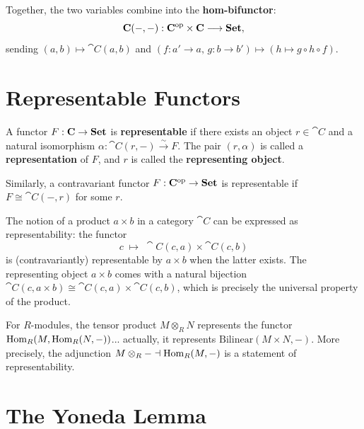 \begin{definition}
Together, the two variables combine into the \textbf{hom-bifunctor}:
\[
  \mathbf{C}(-,-): \mathbf{C}^{\mathrm{op}} \times \mathbf{C} \longrightarrow \mathbf{Set},
\]
sending $(a, b) \mapsto \cat{C}(a,b)$ and $(f: a' \to a,\, g: b \to b') \mapsto (h \mapsto g \circ h \circ f)$.
\end{definition}

\section{Representable Functors}
\label{sec:representable}

\begin{definition}
A functor $F: \mathbf{C} \to \mathbf{Set}$ is \textbf{representable} if there exists an object $r \in \cat{C}$ and a natural isomorphism $\alpha: \cat{C}(r, -) \xrightarrow{\sim} F$. The pair $(r, \alpha)$ is called a \textbf{representation} of $F$, and $r$ is called the \textbf{representing object}.

Similarly, a contravariant functor $F: \mathbf{C}^{\mathrm{op}} \to \mathbf{Set}$ is representable if $F \cong \cat{C}(-,r)$ for some $r$.
\end{definition}

\begin{example}
The notion of a product $a \times b$ in a category $\cat{C}$ can be expressed as representability: the functor
\[
  c \;\mapsto\; \cat{C}(c, a) \times \cat{C}(c, b)
\]
is (contravariantly) representable by $a \times b$ when the latter exists. The representing object $a \times b$ comes with a natural bijection $\cat{C}(c, a\times b) \cong \cat{C}(c,a) \times \cat{C}(c,b)$, which is precisely the universal property of the product.
\end{example}

\begin{example}
For $R$-modules, the tensor product $M \otimes_R N$ represents the functor $\operatorname{Hom}_R(M, \operatorname{Hom}_R(N, -))$... actually, it represents $\text{Bilinear}(M \times N, -)$. More precisely, the adjunction $M \otimes_R - \dashv \operatorname{Hom}_R(M,-)$ is a statement of representability.
\end{example}

\section{The Yoneda Lemma}
\label{sec:yoneda-lemma}


